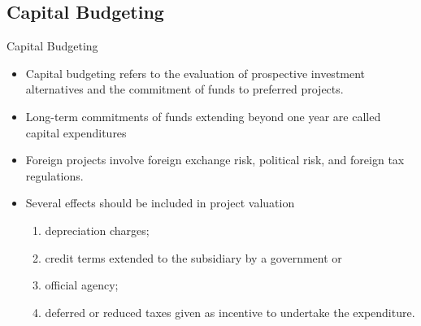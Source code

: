 \documentclass[international_finance_p2.tex]{subfiles}
\begin{document}
\subsection{Capital Budgeting}
\begin{frame}{Capital Budgeting}
\begin{itemize}[<+->]
\item
Capital budgeting refers to the evaluation of prospective investment alternatives and the commitment of funds to preferred projects. 
\item
Long-term commitments of funds extending beyond one year are called capital expenditures
\item
Foreign projects involve foreign exchange risk, political risk, and foreign tax regulations.
\item
Several effects should be included in project valuation 
\begin{enumerate}
\item
depreciation charges; 
\item
credit terms extended to the subsidiary by a government or \item
official agency;
\item
deferred or reduced taxes given as incentive to undertake the expenditure.
\end{enumerate}
\end{itemize}
\end{frame}
\end{document}
